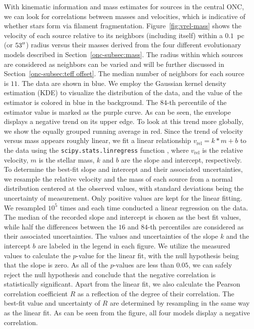 \documentclass[12pt]{ucsddissertation}
\begin{document}
\begin{CJK*}{UTF8}{gbsn}
With kinematic information and mass estimates for sources in the central ONC, we can look for correlations between masses and velocities, which is indicative of whether stars form via filament fragmentation. Figure~\ref{fig:vrel-mass} shows the velocity of each source relative to its neighbors (including itself) within a $0.1$~pc (or $53\mbox{$^{\prime\prime}$}$) radius versus their masses derived from the four different evolutionary models described in Section~\ref{onc-subsec:mass}. The radius within which sources are considered as neighbors can be varied and will be further discussed in Section~\ref{onc-subsec:teff offset}. The median number of neighbors for each source is $11$. The data are shown in blue. We employ the Gaussian kernel density estimation (KDE) to visualize the distribution of the data, and the value of the estimator is colored in blue in the background. The $84$-th percentile of the estimator value is marked as the purple curve. As can be seen, the envelope displays a negative trend on its upper edge. To look at this trend more globally, we show the equally grouped running average in red.  Since the trend of velocity versus mass appears roughly linear, we fit a linear relationship $v_\mathrm{rel}=k*m+b$ to the data using the \texttt{scipy.stats.linregress} function \citep[][]{scipy}, where $v_\mathrm{rel}$ is the relative velocity, $m$ is the stellar mass, $k$ and $b$ are the slope and intercept, respectively.  To determine the best-fit slope and intercept and their associated uncertainties, we resample the relative velocity and the mass of each source from a normal distribution centered at the observed values, with standard deviations being the uncertainty of measurement. Only positive values are kept for the linear fitting. We resampled $10^5$ times and each time conducted a linear regression on the data. The median of the recorded slope and intercept is chosen as the best fit values, while half the differences between the $16$ and $84$-th percentiles are considered as their associated uncertainties. The values and uncertainties of the slope $k$ and the intercept $b$ are labeled in the legend in each figure. We utilize the measured values to calculate the $p$-value for the linear fit, with the null hypothesis being that the slope is zero. As all of the $p$-values are less than $0.05$, we can safely reject the null hypothesis and conclude that the negative correlation is statistically significant. Apart from the linear fit, we also calculate the Pearson correlation coefficient $R$ as a reflection of the degree of their correlation.  The best-fit value and uncertainty of $R$ are determined by resampling in the same way as the linear fit.  As can be seen from the figure, all four models display a negative correlation. 


\end{CJK*}
\end{document}
